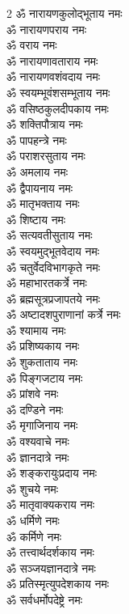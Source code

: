 
\begin{flushleft}
\begin{multicols}{2}
ॐ नारायणकुलोद्भूताय नमः\\
ॐ नारायणपराय नमः\\
ॐ वराय नमः\\
ॐ नारायणावताराय नमः\\
ॐ नारायणवशंवदाय नमः\\
ॐ स्वयम्भूवंशसम्भूताय नमः\\
ॐ वसिष्ठकुलदीपकाय नमः\\
ॐ शक्तिपौत्राय नमः\\
ॐ पापहन्त्रे नमः\\
ॐ पराशरसुताय नमः\hfill{}\\
ॐ अमलाय नमः\\
ॐ द्वैपायनाय नमः\\
ॐ मातृभक्ताय नमः\\
ॐ शिष्टाय नमः\\
ॐ सत्यवतीसुताय नमः\\
ॐ स्वयमुद्भूतवेदाय नमः\\
ॐ चतुर्वेदविभागकृते नमः\\
ॐ महाभारतकर्त्रे नमः\\
ॐ ब्रह्मसूत्रप्रजापतये नमः\\
ॐ अष्टादशपुराणानां कर्त्रे नमः\hfill{}\\
ॐ श्यामाय नमः\\
ॐ प्रशिष्यकाय नमः\\
ॐ शुकताताय नमः\\
ॐ पिङ्गजटाय नमः\\
ॐ प्रांशवे नमः\\
ॐ दण्डिने नमः\\
ॐ मृगाजिनाय नमः\\
ॐ वश्यवाचे नमः\\
ॐ ज्ञानदात्रे नमः\\
ॐ शङ्करायुःप्रदाय नमः\hfill{}\\
ॐ शुचये नमः\\
ॐ मातृवाक्यकराय नमः\\
ॐ धर्मिणे नमः\\
ॐ कर्मिणे नमः\\
ॐ तत्त्वार्थदर्शकाय नमः\\
ॐ सञ्जयज्ञानदात्रे नमः\\
ॐ प्रतिस्मृत्युपदेशकाय नमः\\
ॐ सर्वधर्मोपदेष्ट्रे नमः\\

\end{multicols}
\end{flushleft}
